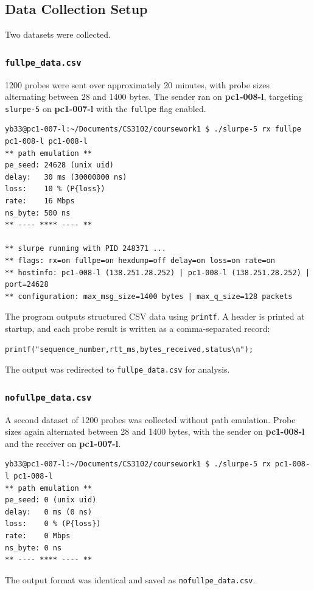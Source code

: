 \subsection{Data Collection Setup}

Two datasets were collected.

\subsubsection{\texttt{fullpe\_data.csv}}

1200 probes were sent over approximately 20 minutes, with probe sizes alternating between 28 and 1400 bytes. The sender ran on \textbf{pc1-008-l}, targeting \texttt{slurpe-5} on \textbf{pc1-007-l} with the \texttt{fullpe} flag enabled.

\begin{verbatim}
yb33@pc1-007-l:~/Documents/CS3102/coursework1 $ ./slurpe-5 rx fullpe pc1-008-l pc1-008-l
** path emulation **
pe_seed: 24628 (unix uid)
delay:   30 ms (30000000 ns)
loss:    10 % (P{loss})
rate:    16 Mbps
ns_byte: 500 ns
** ---- **** ---- **

** slurpe running with PID 248371 ...
** flags: rx=on fullpe=on hexdump=off delay=on loss=on rate=on
** hostinfo: pc1-008-l (138.251.28.252) | pc1-008-l (138.251.28.252) | port=24628
** configuration: max_msg_size=1400 bytes | max_q_size=128 packets
\end{verbatim}

The program outputs structured CSV data using \texttt{printf}. A header is printed at startup, and each probe result is written as a comma-separated record:

\begin{verbatim}
printf("sequence_number,rtt_ms,bytes_received,status\n");
\end{verbatim}

The output was redirected to \texttt{fullpe\_data.csv} for analysis.

\subsubsection{\texttt{nofullpe\_data.csv}}

A second dataset of 1200 probes was collected without path emulation. Probe sizes again alternated between 28 and 1400 bytes, with the sender on \textbf{pc1-008-l} and the receiver on \textbf{pc1-007-l}.

\begin{verbatim}
yb33@pc1-007-l:~/Documents/CS3102/coursework1 $ ./slurpe-5 rx pc1-008-l pc1-008-l
** path emulation **
pe_seed: 0 (unix uid)
delay:   0 ms (0 ns)
loss:    0 % (P{loss})
rate:    0 Mbps
ns_byte: 0 ns
** ---- **** ---- **
\end{verbatim}

The output format was identical and saved as \texttt{nofullpe\_data.csv}.